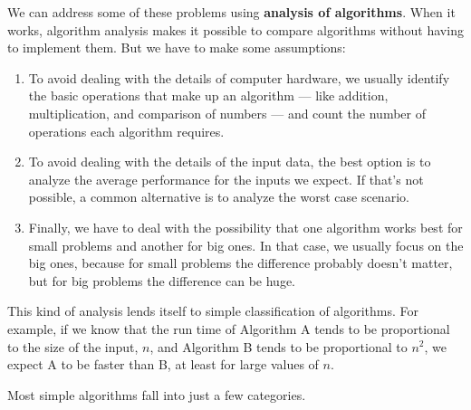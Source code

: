 \documentclass[12pt]{book}
\theoremstyle{exercise}
\begin{document}
We can address some of these problems using {\bf analysis of
  algorithms}. When it works, algorithm analysis makes it possible to
compare algorithms without having to implement them. But we have to
make some assumptions:

\begin{enumerate}

\item To avoid dealing with the details of computer hardware, we
  usually identify the basic operations that make up an algorithm ---
  like addition, multiplication, and comparison of numbers --- and
  count the number of operations each algorithm requires.

\item To avoid dealing with the details of the input data, the best
  option is to analyze the average performance for the inputs we
  expect. If that's not possible, a common alternative is to analyze
  the worst case scenario.

\item Finally, we have to deal with the possibility that one algorithm
  works best for small problems and another for big ones. In that
  case, we usually focus on the big ones, because for small problems
  the difference probably doesn't matter, but for big problems the
  difference can be huge.

\end{enumerate}

This kind of analysis lends itself to simple classification of
algorithms. For example, if we know that the run time of Algorithm A
tends to be proportional to the size of the input, $n$, and Algorithm
B tends to be proportional to $n^2$, we expect A to be faster than B,
at least for large values of $n$.

Most simple algorithms fall into just a few categories.
\end{document}
